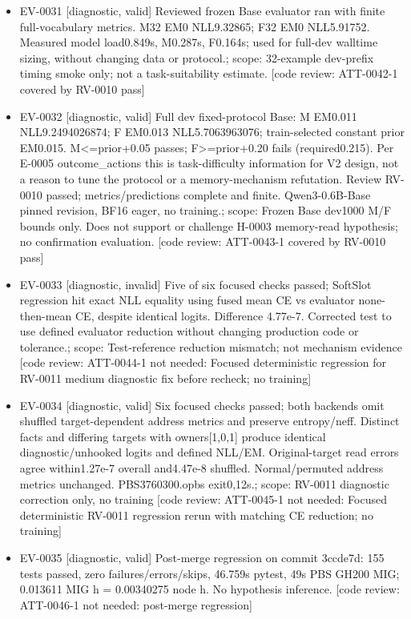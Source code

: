 \documentclass[11pt]{article}
\begin{document}
\begin{itemize}
\item EV-0031 [diagnostic, valid] Reviewed frozen Base evaluator ran with finite full-vocabulary metrics. M32 EM0 NLL9.32865; F32 EM0 NLL5.91752. Measured model load0.849s, M0.287s, F0.164s; used for full-dev walltime sizing, without changing data or protocol.; scope: 32-example dev-prefix timing smoke only; not a task-suitability estimate. [code review: ATT-0042-1 covered by RV-0010 pass]
\item EV-0032 [diagnostic, valid] Full dev fixed-protocol Base: M EM0.011 NLL9.2494026874; F EM0.013 NLL5.7063963076; train-selected constant prior EM0.015. M\textless{}=prior+0.05 passes; F\textgreater{}=prior+0.20 fails (required0.215). Per E-0005 outcome\_actions this is task-difficulty information for V2 design, not a reason to tune the protocol or a memory-mechanism refutation. Review RV-0010 passed; metrics/predictions complete and finite. Qwen3-0.6B-Base pinned revision, BF16 eager, no training.; scope: Frozen Base dev1000 M/F bounds only. Does not support or challenge H-0003 memory-read hypothesis; no confirmation evaluation. [code review: ATT-0043-1 covered by RV-0010 pass]
\item EV-0033 [diagnostic, invalid] Five of six focused checks passed; SoftSlot regression hit exact NLL equality using fused mean CE vs evaluator none-then-mean CE, despite identical logits. Difference 4.77e-7. Corrected test to use defined evaluator reduction without changing production code or tolerance.; scope: Test-reference reduction mismatch; not mechanism evidence [code review: ATT-0044-1 not needed: Focused deterministic regression for RV-0011 medium diagnostic fix before recheck; no training]
\item EV-0034 [diagnostic, valid] Six focused checks passed; both backends omit shuffled target-dependent address metrics and preserve entropy/neff. Distinct facts and differing targets with owners[1,0,1] produce identical diagnostic/unhooked logits and defined NLL/EM. Original-target read errors agree within1.27e-7 overall and4.47e-8 shuffled. Normal/permuted address metrics unchanged. PBS3760300.opbs exit0,12s.; scope: RV-0011 diagnostic correction only, no training [code review: ATT-0045-1 not needed: Focused deterministic RV-0011 regression rerun with matching CE reduction; no training]
\item EV-0035 [diagnostic, valid] Post-merge regression on commit 3ccde7d: 155 tests passed, zero failures/errors/skips, 46.759s pytest, 49s PBS GH200 MIG; 0.013611 MIG h = 0.00340275 node h. No hypothesis inference. [code review: ATT-0046-1 not needed: post-merge regression]

\end{itemize}
\end{document}
